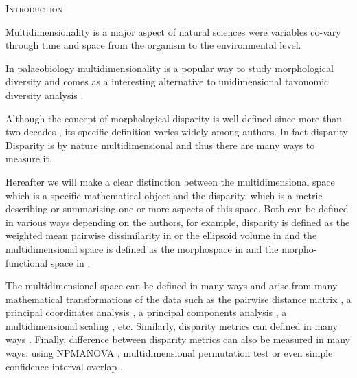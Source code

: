 \documentclass[12pt,letterpaper]{article}
\renewcommand{\section}[1]{%
\bigskip
\begin{center}
\begin{Large}
\normalfont\scshape #1
\medskip
\end{Large}
\end{center}}
\begin{document}
\vspace{1.5in}

\newpage 

%
%

\section{Introduction}

Multidimensionality is a major aspect of natural sciences were variables co-vary through time and space from the organism to the environmental level.

In palaeobiology multidimensionality is a popular way to study morphological diversity and comes as a interesting alternative to unidimensional taxonomic diversity analysis \citep{Hopkins2017}.


Although the concept of morphological disparity is well defined since more than two decades \citep[e.g.][]{gould1991disparity,Foote01071994,Foote29111996}, its specific definition varies widely among authors.
In fact disparity Disparity is by nature multidimensional \citep{lloyd2016estimating} and thus there are many ways to measure it.



Hereafter we will make a clear distinction between the multidimensional space which is a specific mathematical object and the disparity, which is a metric describing or summarising one or more aspects of this space.
Both can be defined in various ways depending on the authors, for example, disparity is defined as the weighted mean pairwise dissimilarity in \cite{Close2015} or the ellipsoid volume in \cite{DonohueDim} and the multidimensional space is defined as the morphospace in \cite{raup1966geometric} and the morpho-functional space in \cite{diaz2016global}.

The multidimensional space can be defined in many ways and arise from many mathematical transformations of the data such as the pairwise distance matrix \citep{Close2015}, a principal coordinates analysis \citep[PCO;][]{Brusatte12092008}, a principal components analysis \citep[PCA;][]{zelditch2012geometric}, a multidimensional scaling \citep[MDS;][]{DonohueDim}, etc.
Similarly, disparity metrics \citep[or indices;][]{Hopkins2017} can defined in many ways \citep[e.g.][or combinations thereof]{Wills2001,Ciampaglio2001,foth2012different,DonohueDim,Hughes20082013,finlay2015morphological,Close2015,diaz2016global}.
Finally, difference between disparity metrics can also be measured in many ways: using NPMANOVA \citep[e.g.][]{Brusatte12092008}, multidimensional permutation test \citep[e.g.][]{diaz2016global} or even simple confidence interval overlap \citep[e.g.][]{halliday2016eutherian}.
\end{document}
